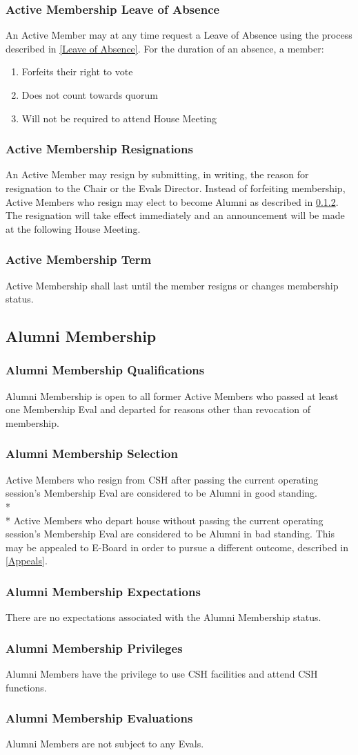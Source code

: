 \documentclass{article}
\newcommand{\asection}[1]{\subsection{#1} \label{#1}}
\newcommand{\asubsection}[1]{\subsubsection{#1} \label{#1}}
\begin{document}
\asubsection{Active Membership Leave of Absence}
\renewcommand{\theenumi}{\alph{enumi}} %

An Active Member may at any time request a Leave of Absence using the process described in \ref{Leave of Absence}.
For the duration of an absence, a member:
\begin{enumerate}
	\item Forfeits their right to vote
	\item Does not count towards quorum
	\item Will not be required to attend House Meeting
\end{enumerate}

\asubsection{Active Membership Resignations}
An Active Member may resign by submitting, in writing, the reason for resignation to the Chair or the Evals Director.
Instead of forfeiting membership, Active Members who resign may elect to become Alumni as described in \ref{Alumni Membership Selection}.
The resignation will take effect immediately and an announcement will be made at the following House Meeting.

\asubsection{Active Membership Term}
Active Membership shall last until the member resigns or changes membership status.

\asection{Alumni Membership}

\asubsection{Alumni Membership Qualifications}
Alumni Membership is open to all former Active Members who passed at least one Membership Eval and departed for reasons other than revocation of membership.

\asubsection{Alumni Membership Selection}
Active Members who resign from CSH after passing the current operating session's Membership Eval are considered to be Alumni in good standing.
\\*\\*
Active Members who depart house without passing the current operating session's Membership Eval are considered to be Alumni in bad standing.
This may be appealed to E-Board in order to pursue a different outcome, described in \ref{Appeals}.

\asubsection{Alumni Membership Expectations}
There are no expectations associated with the Alumni Membership status.

\asubsection{Alumni Membership Privileges}
Alumni Members have the privilege to use CSH facilities and attend CSH functions.

\asubsection{Alumni Membership Evaluations}
Alumni Members are not subject to any Evals.
\end{document}
